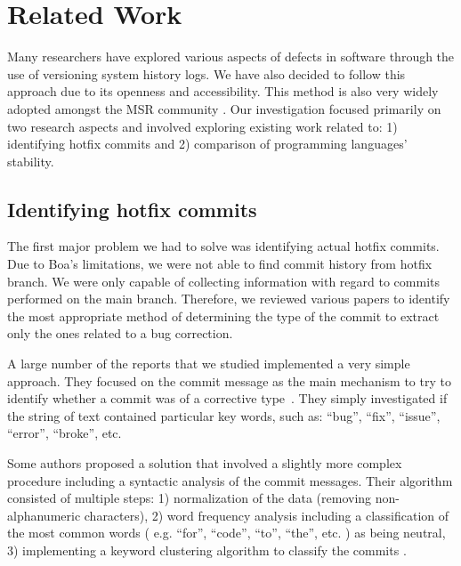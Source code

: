 \section{Related Work}
Many researchers have explored various aspects of defects in software through the use of versioning system history logs. We have also decided to follow this approach due to its openness and accessibility. This method is also very widely adopted amongst the MSR community \cite{Hattori2008}. Our investigation focused primarily on two research aspects and involved exploring existing work related to: 1) identifying hotfix commits and 2) comparison of programming languages’ stability.


\subsection{Identifying hotfix commits}
The first major problem we had to solve was identifying actual hotfix commits. Due to Boa’s limitations, we were not able to find commit history from hotfix branch. We were only capable of collecting information with regard to commits performed on the main branch. Therefore, we reviewed various papers to identify the most appropriate method of determining the type of the commit to extract only the ones related to a bug correction.\par

A large number of the reports that we studied implemented a very simple approach. They focused on the commit message as the main mechanism to try to identify whether a commit was of a corrective type~\cite{Hattori2008, Ratzinger2008, Hindle2008}. They simply investigated if the string of text contained particular key words, such as: ``bug'', ``fix'', ``issue'', ``error'', ``broke'', etc.\par

Some authors proposed a solution that involved a slightly more complex procedure including a syntactic analysis of the commit messages. Their algorithm consisted of multiple steps: 1) normalization of the data (removing non-alphanumeric characters), 2) word frequency analysis including a classification of the most common words ( e.g. ``for'', ``code'', ``to'', ``the'', etc. ) as being neutral, 3) implementing a keyword clustering algorithm to classify the commits \cite{Mockus2000}.\par

